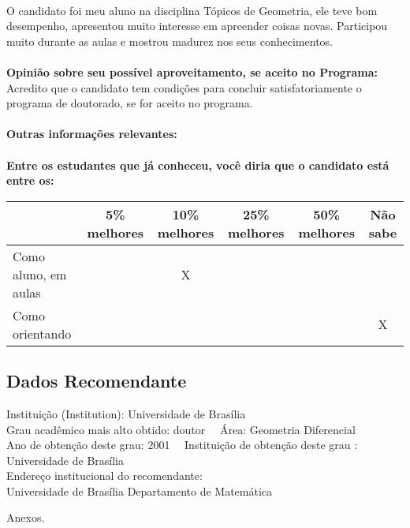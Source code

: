 \documentclass[11pt]{article}
\begin{document}
\\O candidato foi meu aluno na disciplina Tópicos de Geometria, ele teve bom desempenho, apresentou muito interesse em apreender coisas novas. Participou muito durante as aulas e mostrou madurez nos seus conhecimentos.\\
\\
\textbf{Opinião sobre seu possível aproveitamento, se aceito no Programa:}
\\Acredito que o candidato tem condições para concluir satisfatoriamente o programa de doutorado, se for aceito no programa.\\ 
\\
\textbf{Outras informações relevantes:} \\
\\[0.3cm]
\textbf{Entre os estudantes que já conheceu, você diria que o candidato está entre os:}
\\
\begin{tabular}{|l|c|c|c|c|c|}
\hline
 & 5\% melhores & 10\% melhores & 25\% melhores & 50\% melhores & Não sabe \\
\hline
Como aluno, em aulas &  & X &  &  & \\
\hline
Como orientando &  &  &  &  & X\\
\hline
\end{tabular}
\subsection*{Dados Recomendante} 
	Instituição (Institution): Universidade de Brasília
\\ 
	Grau acadêmico mais alto obtido: doutor
	\ \ Área: Geometria Diferencial
	\\
	Ano de obtenção deste grau: 2001
	\ \ 
	Instituição de obtenção deste grau : Universidade de Brasília
	\\ 
	Endereço institucional do recomendante: \\ Universidade de Brasília
Departamento de Matemática 
\begin{center}
Anexos.
\end{center}
\end{document}
